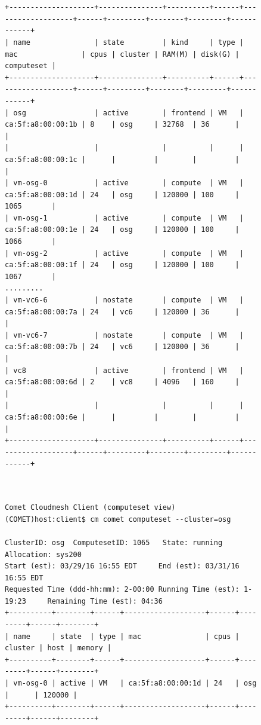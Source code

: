\begin{figure}[htb] 
\begin{small}
\begin{verbatim}


+--------------------+---------------+----------+------+-------------------+------+---------+--------+---------+------------+
| name               | state         | kind     | type | mac               | cpus | cluster | RAM(M) | disk(G) | computeset |
+--------------------+---------------+----------+------+-------------------+------+---------+--------+---------+------------+
| osg                | active        | frontend | VM   | ca:5f:a8:00:00:1b | 8    | osg     | 32768  | 36      |            |
|                    |               |          |      | ca:5f:a8:00:00:1c |      |         |        |         |            |
| vm-osg-0           | active        | compute  | VM   | ca:5f:a8:00:00:1d | 24   | osg     | 120000 | 100     | 1065       |
| vm-osg-1           | active        | compute  | VM   | ca:5f:a8:00:00:1e | 24   | osg     | 120000 | 100     | 1066       |
| vm-osg-2           | active        | compute  | VM   | ca:5f:a8:00:00:1f | 24   | osg     | 120000 | 100     | 1067       |
.........
| vm-vc6-6           | nostate       | compute  | VM   | ca:5f:a8:00:00:7a | 24   | vc6     | 120000 | 36      |            |
| vm-vc6-7           | nostate       | compute  | VM   | ca:5f:a8:00:00:7b | 24   | vc6     | 120000 | 36      |            |
| vc8                | active        | frontend | VM   | ca:5f:a8:00:00:6d | 2    | vc8     | 4096   | 160     |            |
|                    |               |          |      | ca:5f:a8:00:00:6e |      |         |        |         |            |
+--------------------+---------------+----------+------+-------------------+------+---------+--------+---------+------------+
\end{verbatim}
\end{small}
\end{figure}

\begin{figure}[htb] 
\begin{small}
\begin{verbatim}


Comet Cloudmesh Client (computeset view)
(COMET)host:client$ cm comet computeset --cluster=osg

ClusterID: osg	ComputesetID: 1065	 State: running		Allocation: sys200
Start (est): 03/29/16 16:55 EDT		End (est): 03/31/16 16:55 EDT
Requested Time (ddd-hh:mm): 2-00:00	Running Time (est): 1-19:23		Remaining Time (est): 04:36
+----------+--------+------+-------------------+------+---------+------+--------+
| name     | state  | type | mac               | cpus | cluster | host | memory |
+----------+--------+------+-------------------+------+---------+------+--------+
| vm-osg-0 | active | VM   | ca:5f:a8:00:00:1d | 24   | osg     |      | 120000 |
+----------+--------+------+-------------------+------+---------+------+--------+
\end{verbatim}
\end{small}
\end{figure}

